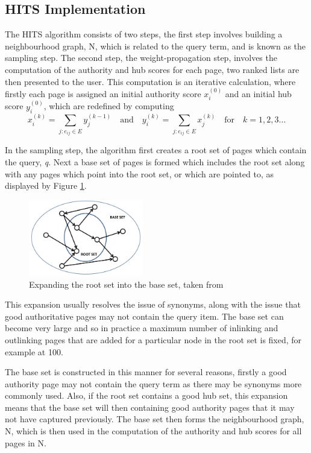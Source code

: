\documentclass[11pt]{report}
\begin{document}
\subsection{HITS Implementation} \label{sec:HITS implementation}
The HITS algorithm consists of two steps, the first step involves building a neighbourhood graph, N, which is related to the query term, and is known as the sampling step. The second step, the weight-propagation step, involves the computation of the authority and hub scores for each page, two ranked lists are then presented to the user. This computation is an iterative calculation, where firstly each page is assigned an initial authority score $x_i^{(0)}$ and an initial hub score $y_i^{(0)}$, which are redefined by computing \begin{equation} \label{eq:HITS1}
x_i^{(k)} = \displaystyle \sum_{j:e_{ij}\in E} y_j^{(k-1)} \quad\mathrm{and}\quad y_i^{(k)} = \displaystyle \sum_{j:e_{ij}\in E} x_j^{(k)}  \quad\mathrm{for}\quad k=1,2,3\ldots
\end{equation} 

In the sampling step, the algorithm first creates a root set of pages which contain the query, \textit{q}. Next a base set of pages is formed which includes the root set along with any pages which point into the root set, or which are pointed to, as displayed by Figure \ref{fig:HITS expanding}. 
\begin{figure}[h]
\centering
\includegraphics[width=5cm]{expanding_root.jpg}
\caption{Expanding the root set into the base set, taken from \cite{pict}}
\label{fig:HITS expanding}
\end{figure}
This expansion usually resolves the issue of synonyms, along with the issue that good authoritative pages may not contain the query item. The base set can become very large and so in practice a maximum number of inlinking and outlinking pages that are added for a particular node in the root set is fixed, for example at 100. 

The base set is constructed in this manner for several reasons, firstly a good authority page may not contain the query term  as there may be synonyms more commonly used. Also, if the root set contains a good hub set, this expansion means that the base set will then containing good authority pages that it may not have captured previously. The base set then forms the neighbourhood graph, N, which is then used in the computation of the authority and hub scores for all pages in N.
\end{document}
